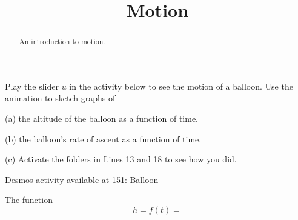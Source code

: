 \documentclass{ximera}
\title{Motion}
\begin{document}
\begin{abstract}
An introduction to motion.
\end{abstract}
\maketitle


\begin{question}  \label{Q:4sdfdsfdellk}

Play the slider $u$ in the activity below to see the motion of a balloon. Use the animation to sketch graphs of

(a) the altitude of the balloon as a function of time.

(b) the balloon's rate of ascent as a function of time.

(c) Activate the folders in Lines 13 and 18 to see how you did.

\begin{onlineOnly}
    \begin{center}
\end{center}
\end{onlineOnly}

Desmos activity available at \href{https://www.desmos.com/calculator/jl0nyqwukz}{151: Balloon}

\end{question}


\begin{question}  \label{QDfsdtegg}
The function
\[
     h = f(t) = 
\]
\end{question}
\end{document}

